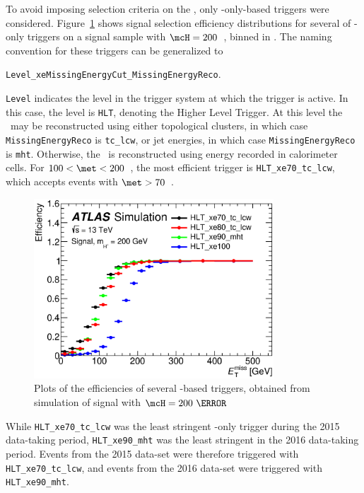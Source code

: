 \par To avoid imposing selection criteria on the \tauvis, only \met-only-based triggers were considered.  
Figure~\ref{fig:trigComp} shows signal selection efficiency distributions for several of \met-only triggers 
on a signal sample with $\mcH=200$~\GeV, binned in \met. The naming convention for these triggers can be  
generalized to
\begin{center}
 \texttt{Level\_xeMissingEnergyCut\_MissingEnergyReco}.
\end{center}
\texttt{Level} indicates the level in the trigger 
system at which the trigger is active. In this case, the level is \texttt{HLT}, denoting the Higher Level Trigger. At 
this level the \met\ may be reconstructed using either topological clusters, in which case 
\texttt{MissingEnergyReco} is \texttt{tc\_lcw}, or jet energies, in which case  
\texttt{MissingEnergyReco} is \texttt{mht}. Otherwise, the \met\ is reconstructed using energy recorded in 
calorimeter cells. For $100<\met<200$~\GeV, 
the most efficient trigger is \texttt{HLT\_xe70\_tc\_lcw}, which accepts events with $\met>70$~\GeV. 

\begin{figure}[!h]
\centering
   \includegraphics[width=0.8\textwidth]{figures/mh200_xe70_xe90_xe100_xe80.eps}
\caption{Plots of the efficiencies of several \met-based triggers, obtained from simulation of signal with $\mcH=200~\GeV$}
\label{fig:trigComp}
\end{figure}
 
\par While \texttt{HLT\_xe70\_tc\_lcw} was the least stringent \met-only trigger during the 2015 data-taking period, 
\texttt{HLT\_xe90\_mht} was the least stringent in the 2016 data-taking period. 
Events from the 2015 data-set were therefore triggered with \texttt{HLT\_xe70\_tc\_lcw}, and events from the 
2016 data-set were triggered with \texttt{HLT\_xe90\_mht}.
 
